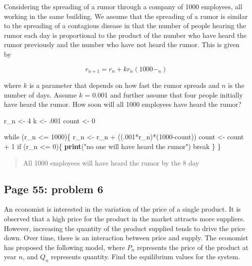 \documentclass[]{article}
\newenvironment{Shaded}{\begin{snugshade}}{\end{snugshade}}
\newcommand{\KeywordTok}[1]{\textcolor[rgb]{0.13,0.29,0.53}{\textbf{{#1}}}}
\newcommand{\DecValTok}[1]{\textcolor[rgb]{0.00,0.00,0.81}{{#1}}}
\newcommand{\StringTok}[1]{\textcolor[rgb]{0.31,0.60,0.02}{{#1}}}
\newcommand{\NormalTok}[1]{{#1}}
\begin{document}
Considering the spreading of a rumor through a company of 1000
employees, all working in the same building. We assume that the
spreading of a rumor is similar to the spreading of a contagious disease
in that the number of people hearing the rumor each day is proportional
to the product of the number who have heard the rumor previously and the
number who have not heard the rumor. This is given by

\[r_{n+1} = r_n + kr_n(1000- _n)\]

where \(k\) is a parameter that depends on how fast the rumor spreads
and \(n\) is the number of days. Assume \(k\) = 0.001 and further assume
that four people initially have heard the rumor. How soon will all 1000
employees have heard the rumor?

\begin{Shaded}
\begin{Highlighting}[]
\NormalTok{r_n <-}\StringTok{ }\DecValTok{4}
\NormalTok{k <-}\StringTok{ }\NormalTok{.}\DecValTok{001}
\NormalTok{count <-}\StringTok{ }\DecValTok{0}

\NormalTok{while (r_n <=}\StringTok{ }\DecValTok{1000}\NormalTok{)\{}
\NormalTok{r_n <-}\StringTok{ }\NormalTok{r_n +}\StringTok{ }\NormalTok{((.}\DecValTok{001}\NormalTok{*r_n)*(}\DecValTok{1000}\NormalTok{-count))}
\NormalTok{count <-}\StringTok{ }\NormalTok{count +}\StringTok{ }\DecValTok{1}
\NormalTok{if (r_n <=}\StringTok{ }\DecValTok{0}\NormalTok{)\{}
  \KeywordTok{print}\NormalTok{(}\StringTok{"no one will have heard the rumor"}\NormalTok{)}
  \NormalTok{break}
 \NormalTok{\}}
\NormalTok{\}}
\end{Highlighting}
\end{Shaded}

\begin{quote}
All 1000 employees will have heard the rumor by the 8 day
\end{quote}

\subsection{Page 55: problem 6}\label{page-55-problem-6}

An economist is interested in the variation of the price of a single
product. It is observed that a high price for the product in the market
attracts more suppliers. However, increasing the quantity of the product
supplied tends to drive the price down. Over time, there is an
interaction between price and supply. The economist has proposed the
following model, where \(P_n\) represents the price of the product at
year \(n\), and \(Q_n\) represents quantity. Find the equilibrium values
for the system.
\end{document}
